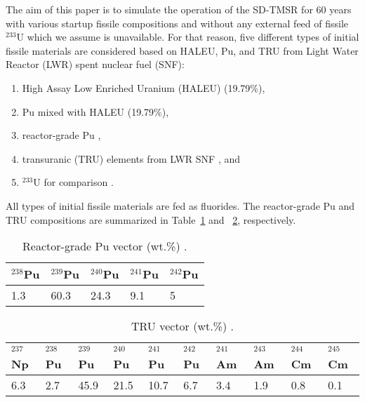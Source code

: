 The aim of this paper is to simulate the  
operation of the \gls{SD-TMSR} for 60 years with various startup fissile 
compositions and without any external feed of fissile $^{233}$U which we 
assume is unavailable. For that reason, five different types of initial 
fissile materials are considered based on \gls{HALEU}, Pu, and \gls{TRU} from Light Water
Reactor (LWR) spent nuclear fuel (SNF):
\begin{enumerate}[label=(\alph*)]
	\item High Assay Low Enriched Uranium (HALEU) (19.79\%),
	\item Pu mixed with \gls{HALEU} (19.79\%),
	\item reactor-grade Pu \cite{marka1993explosive},
	\item transuranic (TRU) elements from LWR SNF \cite{de2000scenarios}, and
	\item $^{233}$U for comparison \cite{ashraf2019whole_core}.
\end{enumerate}
All types of initial fissile materials are fed as fluorides.
The reactor-grade Pu and \gls{TRU} compositions are summarized in 
Table~\ref{tab:table2} and ~\ref{tab:table3}, respectively.

\begin{table} %
	\centering
	\caption{Reactor-grade Pu vector (wt.\%) \cite{marka1993explosive}.}
	\vspace{0.1in}
	\begin{tabularx}{\textwidth}{|X |X |X| X| X|}
		\hline
		$^{238}$Pu & $^{239}$Pu & $^{240}$Pu & $^{241}$Pu & $^{242}$Pu \\
		\hline
		 1.3 &60.3&24.3&9.1&5 \\
		\hline
	\end{tabularx}
	\label{tab:table2}
\end{table}

\begin{table} %
	\centering
	\caption{\gls{TRU} vector (wt.\%) \cite{de2000scenarios}.}
	\vspace{0.1in}
	\begin{tabularx}{\textwidth}{|X| X| X| X| X| X| X| X| X| X|}
		\hline
		$^{237}$Np&$^{238}$Pu & $^{239}$Pu & $^{240}$Pu & $^{241}$Pu & $^{242}$Pu&$^{241}$Am &$^{243}$Am&$^{244}$Cm &$^{245}$Cm\\
		\hline
		6.3&2.7&45.9&21.5&10.7&6.7&3.4&1.9&0.8&0.1 \\
		\hline
	\end{tabularx}
	\label{tab:table3}
\end{table}


